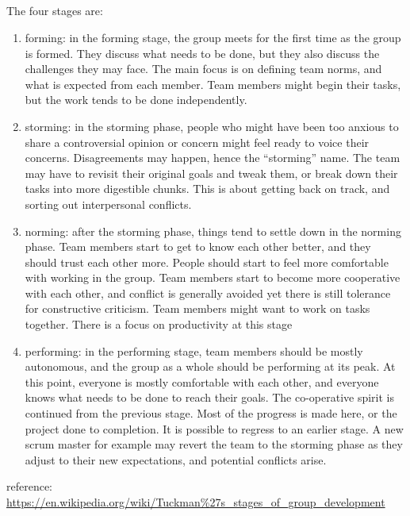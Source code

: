 \documentclass[letterpaper,12pt]{article}
\begin{document}
\subsection{}
The four stages are:
\begin{enumerate}
	\item forming:
	      in the forming stage, the group meets for the first time as the group is formed. They discuss what needs to be done,
	      but they also discuss the challenges they may face. The main focus is on defining team norms, and what is expected
	      from each member. Team members might begin their tasks, but the work tends to be done independently.
	\item storming:
	      in the storming phase, people who
	      might have been too anxious to share a controversial opinion or concern might feel ready to voice their concerns.
	      Disagreements may happen, hence the ``storming'' name. The team may have to revisit their original goals and tweak them,
	      or break down their tasks into more digestible chunks. This is about getting back on track, and sorting out interpersonal conflicts.
	\item norming:
	      after the storming phase, things tend to settle down in the norming phase. Team members start to get to know each other better, and they should trust each other more. People should start to feel more comfortable with working in the group. Team members start to become more cooperative with each other,
	      and conflict is generally avoided yet there is still tolerance for constructive criticism. Team members might want to work on tasks together. There is a focus on productivity at this stage
	\item performing:
	      in the performing stage, team members should be mostly autonomous, and the group as a whole
	      should be performing at its peak. At this point, everyone is mostly comfortable with each other,
	      and everyone knows what needs to be done to reach their goals. The co-operative spirit is continued from the
	      previous stage.
	      Most of the progress is made here, or the project done to completion.
	      It is possible to regress to an earlier stage. A new scrum master for example may revert the team to the storming phase
	      as they adjust to their new expectations, and potential conflicts arise.
\end{enumerate}
reference: \url{https://en.wikipedia.org/wiki/Tuckman\%27s_stages_of_group_development}
\end{document}

